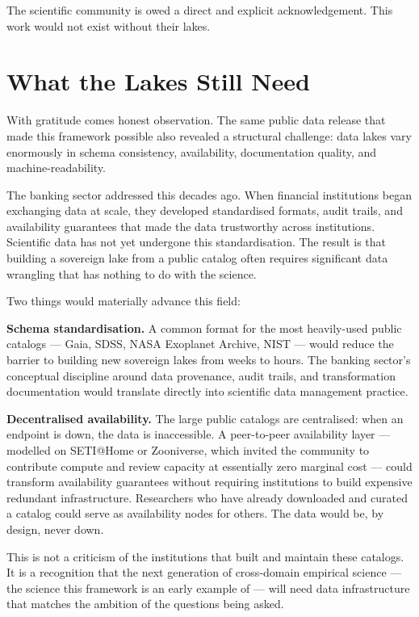 \documentclass[11pt, letterpaper, openany]{book}
\begin{document}
The scientific community is owed a direct and explicit acknowledgement. This work would
not exist without their lakes.

\section*{What the Lakes Still Need}

With gratitude comes honest observation. The same public data release that made this
framework possible also revealed a structural challenge: data lakes vary enormously in
schema consistency, availability, documentation quality, and machine-readability.

The banking sector addressed this decades ago. When financial institutions began
exchanging data at scale, they developed standardised formats, audit trails, and
availability guarantees that made the data trustworthy across institutions. Scientific
data has not yet undergone this standardisation. The result is that building a
sovereign lake from a public catalog often requires significant data wrangling that has
nothing to do with the science.

Two things would materially advance this field:

\textbf{Schema standardisation.} A common format for the most heavily-used public
catalogs --- Gaia, SDSS, NASA Exoplanet Archive, NIST --- would reduce the barrier
to building new sovereign lakes from weeks to hours. The banking sector's conceptual
discipline around data provenance, audit trails, and transformation documentation
would translate directly into scientific data management practice.

\textbf{Decentralised availability.} The large public catalogs are centralised:
when an endpoint is down, the data is inaccessible. A peer-to-peer availability layer
--- modelled on SETI@Home or Zooniverse, which invited the community to contribute
compute and review capacity at essentially zero marginal cost --- could transform
availability guarantees without requiring institutions to build expensive redundant
infrastructure. Researchers who have already downloaded and curated a catalog could
serve as availability nodes for others. The data would be, by design, never down.

This is not a criticism of the institutions that built and maintain these catalogs.
It is a recognition that the next generation of cross-domain empirical science ---
the science this framework is an early example of --- will need data infrastructure
that matches the ambition of the questions being asked.
\end{document}
